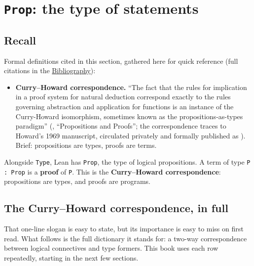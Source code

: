 \section{\texorpdfstring{\texttt{Prop}: the type of statements}{Prop: the type of statements}}\label{sec:03-propositions-and-proofs:01-prop:1}

\subsection{Recall}\label{sec:03-propositions-and-proofs:01-prop:2}

Formal definitions cited in this section, gathered here for quick reference (full citations in the \hyperref[sec:root:bibliography:1]{Bibliography}):

\begin{itemize}
\tightlist
\item
  \textbf{Curry--Howard correspondence.} ``The fact that the rules for implication in a proof system for natural deduction correspond exactly to the rules governing abstraction and application for functions is an instance of the Curry-Howard isomorphism, sometimes known as the propositions-as-types paradigm'' (\cite{TPIL4}, ``Propositions and Proofs''; the correspondence traces to Howard's 1969 manuscript, circulated privately and formally published as \cite{Howard1980}). Brief: propositions are types, proofs are terms.
\end{itemize}

Alongside \texttt{Type}, Lean has \texttt{Prop}, the type of logical propositions. A term of type \texttt{P : Prop} is a \textbf{proof} of \texttt{P}. This is the \textbf{Curry--Howard correspondence}: propositions are types, and proofs are programs.

\subsection{The Curry--Howard correspondence, in full}\label{sec:03-propositions-and-proofs:01-prop:3}

That one-line slogan is easy to state, but its importance is easy to miss on first read. What follows is the full dictionary it stands for: a two-way correspondence between logical connectives and type formers. This book uses each row repeatedly, starting in the next few sections.

